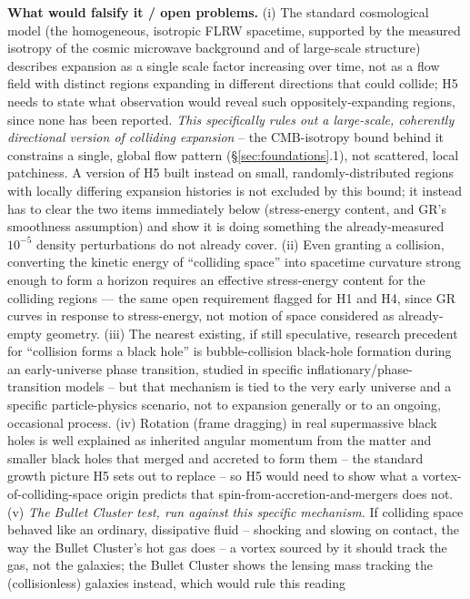 \documentclass[12pt, a4paper]{article}
\begin{document}
\textbf{What would falsify it / open problems.}
(i) The standard cosmological model (the homogeneous, isotropic FLRW
spacetime, supported by the measured isotropy of the cosmic microwave
background and of large-scale structure) describes expansion as a
single scale factor increasing over time, not as a flow field with
distinct regions expanding in different directions that could
collide; H5 needs to state what observation would reveal such
oppositely-expanding regions, since none has been reported.
\emph{This specifically rules out a large-scale, coherently
directional version of colliding expansion} -- the CMB-isotropy bound
behind it constrains a single, global flow pattern
(\S\ref{sec:foundations}.1), not scattered, local patchiness. A
version of H5 built instead on small, randomly-distributed regions
with locally differing expansion histories is not excluded by this
bound; it instead has to clear the two items immediately below
(stress-energy content, and GR's smoothness assumption) and show it
is doing something the already-measured $10^{-5}$ density
perturbations do not already cover. (ii) Even
granting a collision, converting the kinetic energy of ``colliding
space'' into spacetime curvature strong enough to form a horizon
requires an effective stress-energy content for the colliding regions
--- the same open requirement flagged for H1 and H4, since GR curves
in response to stress-energy, not motion of space considered as
already-empty geometry. (iii) The nearest existing, if still
speculative, research precedent for ``collision forms a black hole''
is bubble-collision black-hole formation during an early-universe
phase transition, studied in specific inflationary/phase-transition
models -- but that mechanism is tied to the very early universe and a
specific particle-physics scenario, not to expansion generally or to
an ongoing, occasional process. (iv) Rotation (frame dragging) in
real supermassive black holes is well explained as inherited angular
momentum from the matter and smaller black holes that merged and
accreted to form them -- the standard growth picture H5 sets out to
replace -- so H5 would need to show what a vortex-of-colliding-space
origin predicts that spin-from-accretion-and-mergers does not.
(v) \emph{The Bullet Cluster test, run against this specific
mechanism.} If colliding space behaved like an ordinary, dissipative
fluid -- shocking and slowing on contact, the way the Bullet
Cluster's hot gas does -- a vortex sourced by it should track the gas,
not the galaxies; the Bullet Cluster shows the lensing mass tracking
the (collisionless) galaxies instead, which would rule this reading
\end{document}
